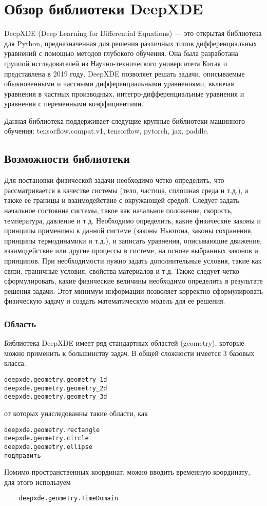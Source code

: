 \chapter{Обзор библиотеки DeepXDE \cite{lu2021deepxde}}

DeepXDE (Deep Learning for Differential Equations) –-- это открытая библиотека для Python,
предназначенная для решения различных типов дифференциальных уравнений с помощью методов
глубокого обучения. Она была разработана группой исследователей из Научно-технического
университета Китая и представлена в 2019 году. DeepXDE позволяет решать задачи, описываемые
обыкновенными и частными дифференциальными уравнениями, включая уравнения в частных производных,
интегро-дифференциальные уравнения и уравнения с переменными коэффициентами.

Данная библиотека поддерживает следущие крупные библиотеки машинного обучения: tensorflow.compat.v1,
tensorflow, pytorch, jax, paddle.

\section{Возможности библиотеки}
Для постановки физической задачи необходимо четко определить, что рассматривается в качестве системы
(тело, частица, сплошная среда и т.д.), а также ее границы и взаимодействие с окружающей средой.
Следует задать начальное состояние системы, такое как начальное положение, скорость, температура,
давление и т.д. Необходимо определить, какие физические законы и принципы применимы к данной системе
(законы Ньютона, законы сохранения, принципы термодинамики и т.д.), и записать уравнения, описывающие
движение, взаимодействие или другие процессы в системе, на основе выбранных законов и принципов. При
необходимости нужно задать дополнительные условия, такие как связи, граничные условия, свойства
материалов и т.д. Также следует четко сформулировать, какие физические величины необходимо определить
в результате решения задачи. Этот минимум информации позволяет корректно сформулировать физическую
задачу и создать математическую модель для ее решения.

\subsection{Область}
Библиотека DeepXDE имеет ряд стандартных областей (geometry), которые можно применить к большинству задач.
В общей сложности имеется 3 базовых класса:
\begin{verbatim}
deepxde.geometry.geometry_1d
deepxde.geometry.geometry_2d
deepxde.geometry.geometry_3d
\end{verbatim}
от которых унаследованны такие области, как
\begin{verbatim}
deepxde.geometry.rectangle
deepxde.geometry.circle
deepxde.geometry.ellipse
подправить
\end{verbatim}
Помимо пространственных координат, можно вводить временную координату, для этого используем
\begin{verbatim}
    deepxde.geometry.TimeDomain
    \end{verbatim}
